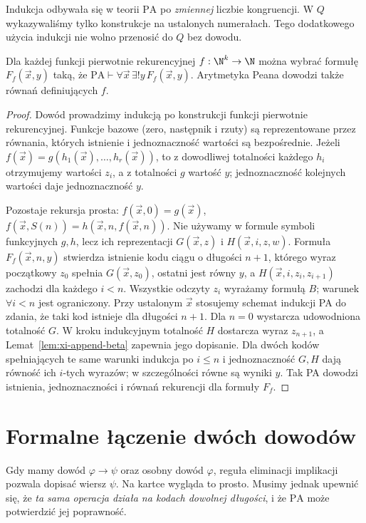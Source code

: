 \begin{uwaga}
Indukcja odbywała się w teorii $\mathrm{PA}$ po \emph{zmiennej}
liczbie kongruencji. W $Q$ wykazywaliśmy tylko konstrukcje
na ustalonych numerałach. Tego dodatkowego użycia indukcji
nie wolno przenosić do $Q$ bez dowodu.
\end{uwaga}

\begin{lemat}
\label{lem:xi-pr-in-pa}
Dla każdej funkcji pierwotnie rekurencyjnej
$f:\N^k\to\N$ można wybrać formułę $F_f(\vec x,y)$
taką, że $\mathrm{PA}\vdash\forall\vec x\,\exists!y\,F_f(\vec x,y)$.
Arytmetyka Peana dowodzi także równań definiujących $f$.
\end{lemat}
\begin{proof}
Dowód prowadzimy indukcją po konstrukcji funkcji
pierwotnie rekurencyjnej. Funkcje bazowe (zero, następnik
i rzuty) są reprezentowane przez równania, których
istnienie i jednoznaczność wartości są bezpośrednie.
Jeżeli $f(\vec x)=g(h_1(\vec x),\ldots,h_r(\vec x))$,
to z dowodliwej totalności każdego $h_i$ otrzymujemy
wartości $z_i$, a z totalności $g$ wartość $y$;
jednoznaczność kolejnych wartości daje jednoznaczność $y$.

Pozostaje rekursja prosta:
$f(\vec x,0)=g(\vec x)$,
$f(\vec x,S(n))=h(\vec x,n,f(\vec x,n))$.
Nie używamy w formule symboli funkcyjnych $g,h$, lecz
ich reprezentacji $G(\vec x,z)$ i $H(\vec x,i,z,w)$.
Formuła $F_f(\vec x,n,y)$ stwierdza istnienie kodu ciągu
o długości $n+1$, którego wyraz początkowy $z_0$
spełnia $G(\vec x,z_0)$, ostatni jest równy $y$, a
$H(\vec x,i,z_i,z_{i+1})$ zachodzi dla każdego $i<n$.
Wszystkie odczyty $z_i$ wyrażamy formułą $B$; warunek
$\forall i<n$ jest ograniczony. Przy ustalonym $\vec x$
stosujemy schemat indukcji PA do zdania, że taki kod
istnieje dla długości $n+1$. Dla $n=0$ wystarcza
udowodniona totalność $G$. W kroku indukcyjnym totalność
$H$ dostarcza wyraz $z_{n+1}$, a
Lemat~\ref{lem:xi-append-beta} zapewnia jego dopisanie.
Dla dwóch kodów spełniających te same warunki indukcja
po $i\le n$ i jednoznaczność $G,H$ dają równość ich
$i$-tych wyrazów; w szczególności równe są wyniki $y$.
Tak PA dowodzi istnienia, jednoznaczności i równań
rekurencji dla formuły $F_f$.
\end{proof}

\section{Formalne łączenie dwóch dowodów}
Gdy mamy dowód $\varphi\to\psi$ oraz osobny dowód
$\varphi$, reguła eliminacji implikacji pozwala dopisać
wiersz $\psi$. Na kartce wygląda to prosto. Musimy
jednak upewnić się, że \emph{ta sama operacja działa
na kodach dowolnej długości}, i że $\mathrm{PA}$
może potwierdzić jej poprawność.


